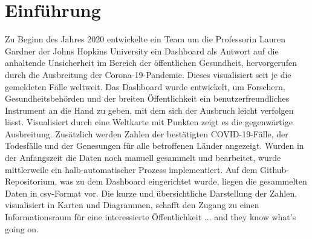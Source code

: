 \chapter{Einführung}
Zu Beginn des Jahres 2020 entwickelte ein Team um die Professorin Lauren Gardner der Johns Hopkins University ein Dashboard 
als Antwort auf die anhaltende Unsicherheit im Bereich der öffentlichen Gesundheit, hervorgerufen durch die Ausbreitung der Corona-19-Pandemie. 
Dieses visualisiert seit je die gemeldeten Fälle weltweit. Das Dashboard wurde entwickelt, um Forschern, Gesundheitsbehörden und der breiten Öffentlichkeit 
ein benutzerfreundliches Instrument an die Hand zu geben, mit dem sich der Ausbruch leicht verfolgen lässt.
Visualisiert durch eine Weltkarte mit Punkten zeigt es die gegenwärtige Ausbreitung.
Zusätzlich werden Zahlen der bestätigten COVID-19-Fälle, der Todesfälle und der Genesungen für alle betroffenen Länder angezeigt\cite[Vgl.][533]{dong_interactive_2020}.
Wurden in der Anfangszeit die Daten noch manuell gesammelt und bearbeitet, wurde mittlerweile ein halb-automatischer Prozess implementiert.
Auf dem Github-Repositorium, was zu dem Dashboard eingerichtet wurde, liegen die gesammelten Daten in csv-Format vor.
Die kurze und übersichtliche Darstellung der Zahlen, visualisiert in Karten und Diagrammen, schafft den Zugang zu einen Informationsraum für eine interessierte
Öffentlichkeit ... and they know what's going on.


